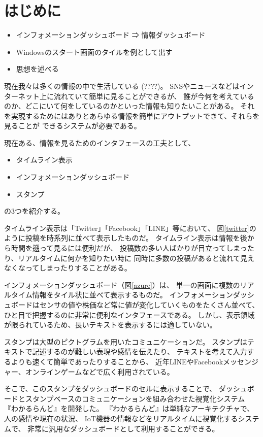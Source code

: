 \section{はじめに}

\begin{itemize}
\item インフォメーションダッシュボード ⇒ 情報ダッシュボード
\item Windowsのスタート画面のタイルを例として出す
\item 思想を述べる
\end{itemize}


現在我々は多くの情報の中で生活している (????)。
SNSやニュースなどはインターネット上に流れていて簡単に見ることができるが、
誰が今何を考えているのか、どこにいて何をしているのかといった情報も知りたいことがある。
それを実現するためにはありとあらゆる情報を簡単にアウトプットできて、それらを見ることが
できるシステムが必要である。

現在ある、情報を見るためのインタフェースの工夫として、
\begin{itemize}
\item タイムライン表示
\item インフォメーションダッシュボード
\item スタンプ
\end{itemize}
の3つを紹介する。

タイムライン表示は「Twitter」「Facebook」「LINE」等において、
図\ref{twitter}のように投稿を時系列に並べて表示したものだ。
タイムライン表示は情報を後から時間を遡って見るには便利だが、
投稿数の多い人ばかりが目立ってしまったり、リアルタイムに何かを知りたい時に
同時に多数の投稿があると流れて見えなくなってしまったりすることがある。

インフォメーションダッシュボード（図\ref{azure}）は、
単一の画面に複数のリアルタイム情報をタイル状に並べて表示するものだ。
インフォメーションダッシュボードはセンサの値や株価など常に値が変化していくものをたくさん並べて、
ひと目で把握するのに非常に便利なインタフェースである。
しかし、表示領域が限られているため、長いテキストを表示するには適していない。

スタンプは大型のピクトグラムを用いたコミュニケーションだ。
スタンプはテキストで記述するのが難しい表現や感情を伝えたり、
テキストを考えて入力するよりも速くて簡単であったりすることから、
近年LINEやFacebookメッセンジャー、オンラインゲームなどで広く利用されている。

そこで、このスタンプをダッシュボードのセルに表示することで、
ダッシュボードとスタンプベースのコミュニケーションを組み合わせた視覚化システム
『わかるらんど』を開発した。
『わかるらんど』は単純なアーキテクチャで、人の感情や現在の状況、
IoT機器の情報などをリアルタイムに視覚化するシステムで、
非常に汎用なダッシュボードとして利用することができる。

